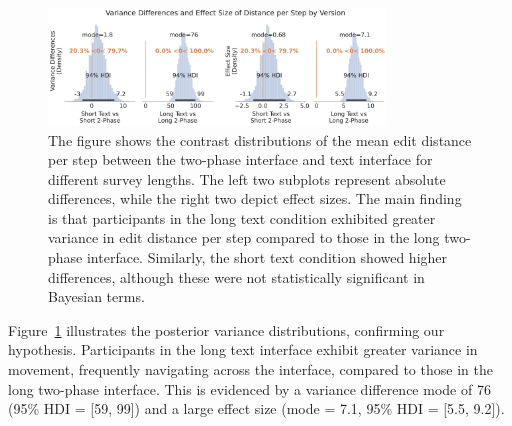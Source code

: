 \begin{figure}[h]
    \centering
    \includegraphics[width=0.8\textwidth]{content/image/distance/distance_diff_per_step_effect_size_by_version.pdf}
    \caption{The figure shows the contrast distributions of the mean edit distance per step between the two-phase interface and text interface for different survey lengths. The left two subplots represent absolute differences, while the right two depict effect sizes. The main finding is that participants in the long text condition exhibited greater variance in edit distance per step compared to those in the long two-phase interface. Similarly, the short text condition showed higher differences, although these were not statistically significant in Bayesian terms.}
    \label{fig:step-over-distance_bayesian}
\end{figure}

Figure~\ref{fig:step-over-distance_bayesian} illustrates the posterior variance distributions, confirming our hypothesis. Participants in the long text interface exhibit greater variance in movement, frequently navigating across the interface, compared to those in the long two-phase interface. This is evidenced by a variance difference mode of 76 (95\% HDI = [59, 99]) and a large effect size (mode = 7.1, 95\% HDI = [5.5, 9.2]).

